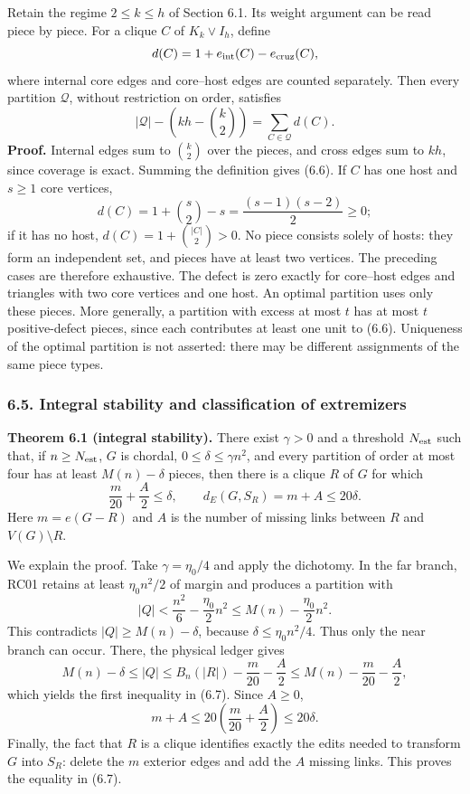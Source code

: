 \documentclass[english,11pt,a4paper]{article}
\begin{document}
Retain the regime \(2\le k\le h\) of Section 6.1. Its weight argument can be read piece by piece. For a clique \(C\) of \(K_k\vee I_h\), define \[
d(C)=1+e_{\rm int}(C)-e_{\rm cruz}(C),
\] where internal core edges and core--host edges are counted separately. Then every partition \(\mathcal Q\), without restriction on order, satisfies \[
|\mathcal Q|-\left(kh-\binom k2\right)
=\sum_{C\in\mathcal Q}d(C).
\tag{6.6}
\] \textbf{Proof.} Internal edges sum to \(\binom k2\) over the pieces, and cross edges sum to \(kh\), since coverage is exact. Summing the definition gives (6.6). If \(C\) has one host and \(s\ge1\) core vertices, \[
d(C)=1+\binom s2-s=\frac{(s-1)(s-2)}2\ge0;
\] if it has no host, \(d(C)=1+\binom{|C|}2>0\). No piece consists solely of hosts: they form an independent set, and pieces have at least two vertices. The preceding cases are therefore exhaustive. The defect is zero exactly for core--host edges and triangles with two core vertices and one host. An optimal partition uses only these pieces. More generally, a partition with excess at most \(t\) has at most \(t\) positive-defect pieces, since each contributes at least one unit to (6.6). Uniqueness of the optimal partition is not asserted: there may be different assignments of the same piece types.


\subsubsection{6.5. Integral stability and classification of extremizers}\label{integral-stability-and-classification-of-extremizers}


\textbf{Theorem 6.1 (integral stability).} There exist \(\gamma>0\) and a threshold \(N_{\rm est}\) such that, if \(n\ge N_{\rm est}\), \(G\) is chordal, \(0\le\delta\le\gamma n^2\), and every partition of order at most four has at least \(M(n)-\delta\) pieces, then there is a clique \(R\) of \(G\) for which \[
\frac m{20}+\frac A2\le\delta,
\qquad
d_E(G,S_R)=m+A\le20\delta.
\tag{6.7}
\] Here \(m=e(G-R)\) and \(A\) is the number of missing links between \(R\) and \(V(G)\setminus R\).

We explain the proof. Take \(\gamma=\eta_0/4\) and apply the dichotomy. In the far branch, RC01 retains at least \(\eta_0n^2/2\) of margin and produces a partition with \[
|Q|<\frac{n^2}{6}-\frac{\eta_0}{2}n^2
\le M(n)-\frac{\eta_0}{2}n^2.
\] This contradicts \(|Q|\ge M(n)-\delta\), because \(\delta\le\eta_0n^2/4\). Thus only the near branch can occur. There, the physical ledger gives \[
M(n)-\delta\le |Q|
\le B_n(|R|)-\frac m{20}-\frac A2
\le M(n)-\frac m{20}-\frac A2,
\] which yields the first inequality in (6.7). Since \(A\ge0\), \[
m+A\le20\left(\frac m{20}+\frac A2\right)\le20\delta.
\] Finally, the fact that \(R\) is a clique identifies exactly the edits needed to transform \(G\) into \(S_R\): delete the \(m\) exterior edges and add the \(A\) missing links. This proves the equality in (6.7).
\end{document}
